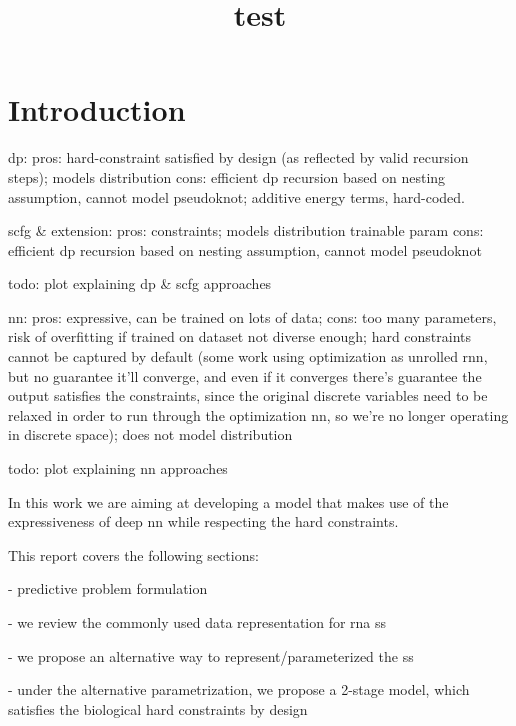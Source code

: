 \documentclass[12pt]{article}
\title{test}
\begin{document}
\maketitle



\section{Introduction}

dp:
pros: hard-constraint satisfied by design (as reflected by valid recursion steps);
models distribution
cons: efficient dp recursion based on nesting assumption, cannot model pseudoknot;
additive energy terms, hard-coded.

scfg & extension:
pros: constraints;
models distribution
trainable param
cons: efficient dp recursion based on nesting assumption, cannot model pseudoknot


todo: plot explaining dp & scfg approaches

nn:
pros: expressive, can be trained on lots of data;
cons: too many parameters, risk of overfitting if trained on dataset not diverse enough;
hard constraints cannot be captured by default
(some work using optimization as unrolled rnn, but no guarantee it'll converge,
and even if it converges there's guarantee the output satisfies the constraints,
since the original discrete variables need to be relaxed in order to run through the optimization nn,
so we're no longer operating in discrete space);
does not model distribution

todo: plot explaining nn approaches


In this work we are aiming at developing a model that makes use of the expressiveness of deep nn
while respecting the hard constraints.

This report covers the following sections:

- predictive problem formulation

- we review the commonly used data representation for rna ss

- we propose an alternative way to represent/parameterized the ss

- under the alternative parametrization, we propose a 2-stage model,
which satisfies the biological hard constraints by design
\end{document}

